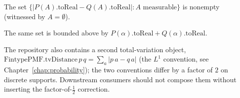 \begin{lemma}
\label{lem:tvDistReal-set-nonempty}
  \leanok
The set $\{ |P(A).\mathrm{toReal} - Q(A).\mathrm{toReal}| : A \text{ measurable} \}$
is nonempty (witnessed by $A = \emptyset$).
\end{lemma}

\begin{lemma}
\label{lem:tvDistReal-set-bddAbove}
  \leanok
The same set is bounded above by $P(\alpha).\mathrm{toReal} + Q(\alpha).\mathrm{toReal}$.
\end{lemma}

\begin{remark}
The repository also contains a second total-variation object,
$\mathrm{FintypePMF.tvDistance}\,p\,q = \sum_a |p\,a - q\,a|$ (the
$L^1$ convention, see Chapter~\ref{chap:probability}); the two
conventions differ by a factor of $2$ on discrete supports.
Downstream consumers should not compose them without inserting the
factor-of-$\tfrac{1}{2}$ correction.
\end{remark}
